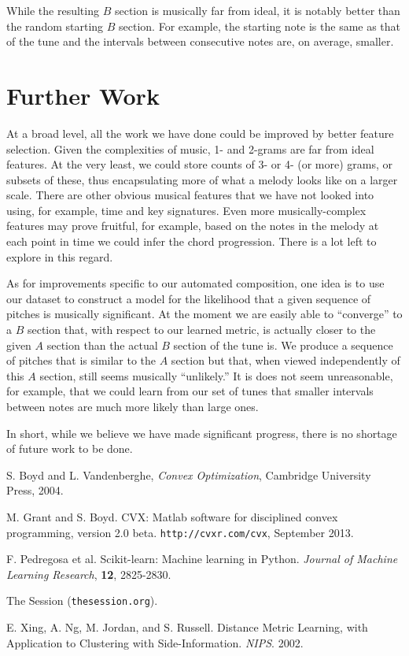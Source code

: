 \documentclass{article} %
\begin{document}
While the resulting $B$ section is musically far from ideal, it is notably
better than the random starting $B$ section. For example, the starting note is
the same as that of the tune and the intervals between consecutive notes are, on
average, smaller.

\section{Further Work}
At a broad level, all the work we have done could be improved by better feature
selection. Given the complexities of music, 1- and 2-grams are far from ideal
features. At the very least, we could store counts of 3- or 4- (or more) grams,
or subsets of these, thus encapsulating more of what a melody looks like on a
larger scale. There are other obvious musical features that we have not looked
into using, for example, time and key signatures. Even more musically-complex
features may prove fruitful, for example, based on the notes in the melody at
each point in time we could infer the chord progression. There is a lot left
to explore in this regard.

As for improvements specific to our automated composition, one idea is to
use our dataset to construct a model for the likelihood that a given sequence
of pitches is musically significant. At the moment we are easily able to
``converge'' to a $B$ section that, with respect to our learned metric, is
actually closer to the given $A$ section than the actual $B$ section of the
tune is. We produce a sequence of pitches that is similar to the $A$ section
but that, when viewed independently of this $A$ section, still seems musically
``unlikely.'' It is does not seem unreasonable, for example, that we could
learn from our set of tunes that smaller intervals between notes are much more
likely than large ones.

In short, while we believe we have made significant progress, there is no
shortage of future work to be done.

\begin{thebibliography}{9}

S. Boyd and L. Vandenberghe, \textit{Convex Optimization}, Cambridge University
Press, 2004.

M. Grant and S. Boyd. CVX: Matlab software for disciplined convex
programming, version 2.0 beta. \texttt{http://cvxr.com/cvx}, September 2013.

F. Pedregosa et al. Scikit-learn: Machine learning in Python. 
\textit{Journal of Machine Learning Research}, \textbf{12}, 2825-2830.

The Session (\texttt{thesession.org}).

E. Xing, A. Ng, M. Jordan, and S. Russell. Distance Metric Learning, with
Application to Clustering with Side-Information. \textit{NIPS}. 2002.

\end{thebibliography}
\end{document}
